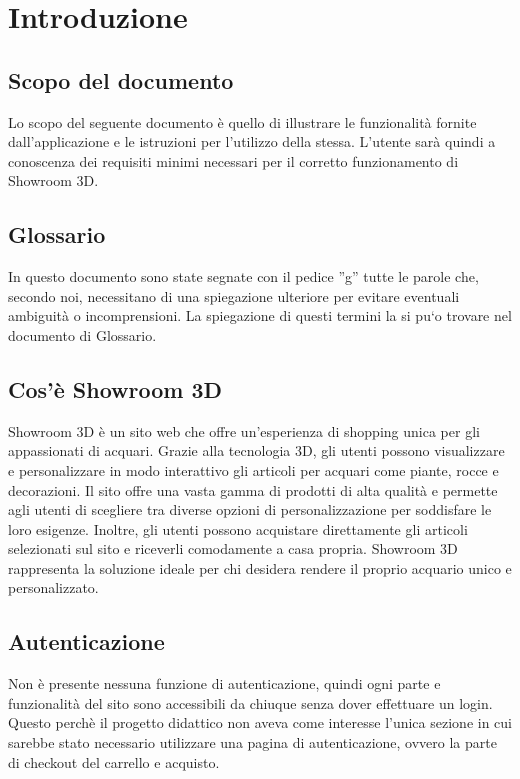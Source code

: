 \section{Introduzione}
\subsection{Scopo del documento}
Lo scopo del seguente documento è quello di illustrare le funzionalità fornite dall’applicazione e le
istruzioni per l’utilizzo della stessa. L’utente sarà quindi a conoscenza dei requisiti minimi necessari
per il corretto funzionamento di Showroom 3D.
\subsection{Glossario}
In questo documento sono state segnate con il pedice ”g” tutte le parole che, secondo noi, necessitano
di una spiegazione ulteriore per evitare eventuali ambiguità o incomprensioni. La spiegazione di questi
termini la si pu`o trovare nel documento di Glossario.
\subsection{Cos'è Showroom 3D}
Showroom 3D è un sito web che offre un'esperienza di shopping unica per gli appassionati di acquari. Grazie alla tecnologia 3D, gli utenti possono visualizzare e personalizzare in modo interattivo gli articoli per acquari come piante, rocce e decorazioni. Il sito offre una vasta gamma di prodotti di alta qualità e permette agli utenti di scegliere tra diverse opzioni di personalizzazione per soddisfare le loro esigenze. Inoltre, gli utenti possono acquistare direttamente gli articoli selezionati sul sito e riceverli comodamente a casa propria. Showroom 3D rappresenta la soluzione ideale per chi desidera rendere il proprio acquario unico e personalizzato.
\subsection{Autenticazione}
Non è presente nessuna funzione di autenticazione, quindi ogni parte e funzionalità del sito sono accessibili da chiuque senza dover effettuare un login. 
Questo perchè il progetto didattico non aveva come interesse l'unica sezione in cui sarebbe stato necessario utilizzare una pagina di autenticazione, ovvero la parte di checkout del carrello e acquisto.
